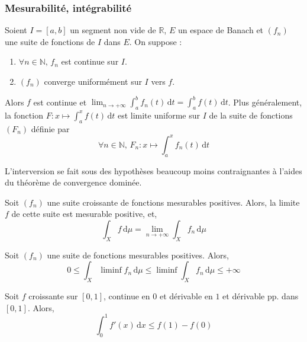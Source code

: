 	\subsubsection{Mesurabilité, intégrabilité}
	
	
	\begin{theorem}
		Soient $I = [a,b]$ un segment non vide de $\mathbb{R}$, $E$ un espace de Banach et $(f_n)$ une suite de fonctions de $I$ dans $E$. On suppose :
		\begin{enumerate}[label=(\roman*)]
			\item $\forall n \in \mathbb{N}, \, f_n$ est continue sur $I$.
			\item $(f_n)$ converge uniformément sur $I$ vers $f$.
		\end{enumerate}
		Alors $f$ est continue et $\lim_{n \rightarrow +\infty} \int_a^b f_n(t) \, \mathrm{d}t = \int_a^b f(t) \, \mathrm{d}t$. Plus généralement, la fonction $F : x \mapsto \int_a^x f(t) \, \mathrm{d}t$ est limite uniforme sur $I$ de la suite de fonctions $(F_n)$ définie par
		\[ \forall n \in \mathbb{N}, \, F_n : x \mapsto \int_a^x f_n(t) \, \mathrm{d}t \]
	\end{theorem}
	
	\begin{remark}
		L'interversion se fait sous des hypothèses beaucoup moins contraignantes à l'aides du théorème de convergence dominée.
	\end{remark}
	
	\reference[B-P]{124}
	
	\begin{theorem}
		Soit $(f_n)$ une suite croissante de fonctions mesurables positives. Alors, la limite $f$ de cette suite est mesurable positive, et,
		\[ \int_X f \, \mathrm{d}\mu = \lim_{n \rightarrow +\infty} \int_X f_n \, \mathrm{d}\mu \]
	\end{theorem}
	
	\reference{137}
	
	\begin{theorem}
		Soit $(f_n)$ une suite de fonctions mesurables positives. Alors,
		\[ 0 \leq \int_X \liminf f_n \, \mathrm{d}\mu \leq \liminf \int_X f_n \, \mathrm{d}\mu \leq +\infty \]
	\end{theorem}
	
	\begin{example}
		\label{241-1}
		Soit $f$ croissante sur $[0,1]$, continue en $0$ et dérivable en $1$ et dérivable pp. dans $[0,1]$. Alors,
		\[ \int_{0}^{1} f'(x) \, \mathrm{d}x \leq f(1) - f(0) \]
	\end{example}
	
